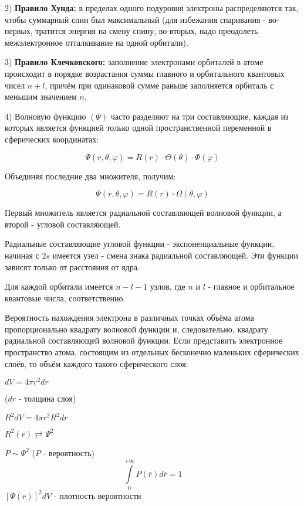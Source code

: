 \par\smallskip

2) \textbf{Правило Хунда:} в пределах одного подуровня электроны распределяются так, чтобы суммарный спин был
максимальный (для избежания спаривания - во-первых, тратится энергия на смену спину, во-вторых, надо преодолеть
межэлектронное отталкивание на одной орбитали).

\par\smallskip

3) \textbf{Правило Клечковского:}
 заполнение электронами орбиталей в атоме происходит в порядке возрастания суммы
главного и орбитального квантовых чисел $n+l$, причём при одинаковой сумме раньше заполняется орбиталь с
меньшим значением $n$.

\par\smallskip

4) Волновую функцию $(\Psi)$
 часто разделяют на три составляющие,
каждая из которых является функцией только одной
пространственной переменной в сферических координатах:

$$\Psi(r,\theta,\varphi) = R(r)\cdot\varTheta(\theta)\cdot\varPhi(\varphi)$$

Объединяя последние два множителя, получим:

$$\Psi(r,\theta,\varphi) = R(r)\cdot\Omega(\theta,\varphi)$$


Первый множитель является радиальной составляющей
волновой функции, а второй - угловой составляющей.

\par\smallskip

Радиальные составляющие угловой функции -
экспоненциальные функции, начиная с $2s$ имеется узел - смена
знака радиальной составляющей. Эти функции зависят только от
расстояния от ядра.

\par\smallskip

Для каждой орбитали имеется $n-l-1$ узлов, где $n$ и $l$ - главное и
орбитальное квантовые числа, соответственно.

\par\smallskip

Вероятность нахождения электрона в различных точках объёма
атома пропорционально квадрату волновой функции и,
следовательно, квадрату радиальной составляющей волновой
функции. Если представить электронное пространство атома,
состоящим из отдельных бесконечно маленьких сферических
слоёв, то объём каждого такого сферического слоя: 

\begin{center}
	$dV=4\pi r^2 dr$
	\par\smallskip
	($dr$ - толщина слоя)
	\par\smallskip
	$R^2dV=4\pi r^2R^2dr$
	\par\smallskip
	$R^2(r)\rightleftarrows\Psi^2$
	\par\smallskip
	$P\sim\Psi^2$ ($P$ - вероятность)
	$$\int\limits_0^{+\infty}P(\bar{r})d\bar{r}=1$$
    $[\Psi(r)]^2dV$ - плотность вероятности
	
\end{center}

